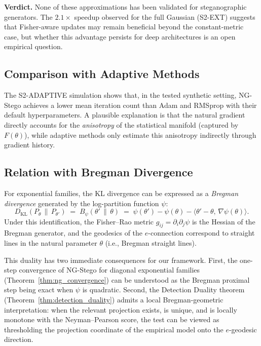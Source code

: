 \documentclass[a4paper,fleqn]{cas-dc}
\newcommand{\DKL}{D_{\mathrm{KL}}}
\begin{document}
\textbf{Verdict.}  None of these approximations has been validated for
steganographic generators. The $2.1\times$ speedup observed for the full Gaussian (S2-EXT) suggests that Fisher-aware updates may remain beneficial beyond the constant-metric
case, but whether this advantage persists for deep architectures is an
open empirical question.

\subsection{Comparison with Adaptive Methods}

The S2-ADAPTIVE simulation shows that,
in the tested synthetic setting, NG-Stego achieves a lower mean iteration
count than Adam and RMSprop with their default hyperparameters. A plausible explanation is that the natural gradient directly accounts for
the \emph{anisotropy} of the statistical manifold (captured by $F(\theta)$), while adaptive methods only estimate this anisotropy indirectly through gradient history.

\subsection{Relation with Bregman Divergence}
\label{subsec:bregman}

For exponential families, the KL divergence can be expressed as a
\emph{Bregman divergence} generated by the log-partition function $\psi$:
\begin{equation}
  \DKL(P_\theta \,\|\, P_{\theta'})
  \;=\;
  B_\psi(\theta' \,\|\, \theta)
  \;=\;
  \psi(\theta') - \psi(\theta)
  - \langle\theta' - \theta,\, \nabla\psi(\theta)\rangle.
  \label{eq:bregman_kl}
\end{equation}
Under this identification, the Fisher--Rao metric $g_{ij}=\partial_i\partial_j\psi$
is the Hessian of the Bregman generator, and the geodesics of the
$e$-connection correspond to straight lines in the natural parameter
$\theta$ (i.e., Bregman straight lines).

This duality has two immediate consequences for our framework.
First, the one-step convergence of NG-Stego for diagonal exponential
families (Theorem~\ref{thm:ng_convergence}) can be understood as the
Bregman proximal step being exact when $\psi$ is quadratic.
Second, the Detection Duality theorem
(Theorem~\ref{thm:detection_duality}) admits a local Bregman-geometric
interpretation: when the relevant projection exists, is unique, and is
locally monotone with the Neyman--Pearson score, the test can be viewed as
thresholding the projection coordinate of the empirical model onto the
$e$-geodesic direction.
\end{document}
